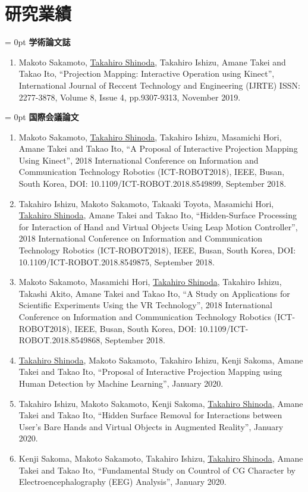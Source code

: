 \chapter*{研究業績}
\thispagestyle{fancy}


\parindent = 0pt
{\Large \bf 学術論文誌}
\begin{enumerate}[1.]
    \item Makoto Sakamoto, \underline{Takahiro Shinoda}, Takahiro Ishizu, Amane Takei and Takao Ito, ``Projection Mapping: Interactive Operation using Kinect'', International Journal of Reccent Technology and Engineering (IJRTE) ISSN: 2277-3878, Volume 8, Issue 4, pp.9307-9313, November 2019. 
\end{enumerate}
 
\vspace{10pt}

\parindent = 0pt
{\Large \bf 国際会議論文}
\begin{enumerate}[1.]
    \item Makoto Sakamoto, \underline{Takahiro Shinoda}, Takahiro Ishizu, Masamichi Hori, Amane Takei and  Takao Ito, ``A Proposal of Interactive Projection Mapping Using Kinect'', 2018 International Conference on Information and Communication Technology Robotics (ICT-ROBOT2018), IEEE, Busan, South Korea, DOI: 10.1109/ICT-ROBOT.2018.8549899, September 2018.
    \item Takahiro Ishizu, Makoto Sakamoto, Takaaki Toyota, Masamichi Hori, \underline{Takahiro Shinoda}, Amane Takei and Takao Ito, ``Hidden-Surface Processing for Interaction of Hand and Virtual Objects Using Leap Motion Controller'', 2018 International Conference on Information and Communication Technology Robotics (ICT-ROBOT2018), IEEE, Busan, South Korea, DOI: 10.1109/ICT-ROBOT.2018.8549875, September 2018.
    \item Makoto Sakamoto, Masamichi Hori, \underline{Takahiro Shinoda}, Takahiro Ishizu, Takashi Akito, Amane Takei and Takao Ito, ``A Study on Applications for Scientific Experiments Using the VR Technology'', 2018 International Conference on Information and Communication Technology Robotics (ICT-ROBOT2018), IEEE, Busan, South Korea, DOI: 10.1109/ICT-ROBOT.2018.8549868, September 2018.
    \item \underline{Takahiro Shinoda}, Makoto Sakamoto, Takahiro Ishizu,  Kenji Sakoma, Amane Takei and Takao Ito, ``Proposal of Interactive Projection Mapping using Human Detection by Machine Learning'', January 2020.
    \item Takahiro Ishizu, Makoto Sakamoto, Kenji Sakoma, \underline{Takahiro Shinoda}, Amane Takei and Takao Ito, ``Hidden Surface Removal for Interactions between User’s Bare Hands and Virtual Objects in Augmented Reality'', January 2020.
    \item Kenji Sakoma, Makoto Sakamoto, Takahiro Ishizu, \underline{Takahiro Shinoda}, Amane Takei and Takao Ito, ``Fundamental Study on Countrol of CG Character by Electroencephalography (EEG) Analysis'', January 2020.
\end{enumerate}

